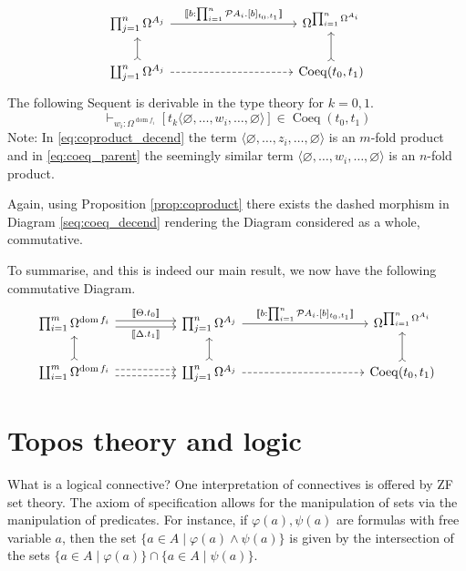 \documentclass{tac}
\newcommand{\call}[1]{\mathcal{#1}}
\begin{document}
	\begin{equation}\label{eq:coeq_parent}
		\begin{tikzcd}[column sep = huge]
			\prod_{j = 1}^n\Omega^{A_j} \arrow[rr,"{\llbracket b:\prod_{i = 1}^n \call{P}A_i. [b]_{t_0,t_1} \rrbracket}"] && \Omega^{\prod_{i = 1}^n \Omega^{A_i}}\\
			\coprod_{j = 1}^n \Omega^{A_j}\arrow[u,rightarrowtail]\arrow[rr,dashed] && \operatorname{Coeq}(t_0,t_1)\arrow[u,rightarrowtail]
		\end{tikzcd}
	\end{equation}
	The following Sequent is derivable in the type theory for $k=0,1$.
	\begin{equation}\label{seq:coeq_decend}
		\vdash_{w_i:\Omega^{\operatorname{dom}f_i}}[t_k\langle \varnothing, \hdots, w_i, \hdots, \varnothing \rangle] \in \operatorname{Coeq}(t_0,t_1)
	\end{equation}
	Note: In \eqref{eq:coproduct_decend} the term $\langle \varnothing, \hdots, z_i, \hdots, \varnothing \rangle$ is an $m$-fold product and in \eqref{eq:coeq_parent} the seemingly similar term $\langle \varnothing, \hdots, w_i, \hdots, \varnothing \rangle$ is an $n$-fold product.
	
	Again, using Proposition \ref{prop:coproduct} there exists the dashed morphism in Diagram \eqref{seq:coeq_decend} rendering the Diagram considered as a whole, commutative.
	
	To summarise, and this is indeed our main result, we now have the following commutative Diagram.
	\begin{equation}\label{eq:colimit_complete}
		\begin{tikzcd}[column sep = huge]
			\prod_{i = 1}^m \Omega^{\operatorname{dom}f_i}\arrow[r,shift left, "{\llbracket\Theta.  t_0 \rrbracket}"]\arrow[r,swap,shift right,"{\llbracket \Delta. t_1\rrbracket}"] & \prod_{j = 1}^n\Omega^{A_j} \arrow[rr,"{\llbracket b:\prod_{i = 1}^n \call{P}A_i. [b]_{t_0,t_1} \rrbracket}"] & & \Omega^{\prod_{i = 1}^n \Omega^{A_i}}\\
			\coprod_{i = 1}^m \Omega^{\operatorname{dom}f_i}\arrow[u,rightarrowtail]\arrow[r,shift left, dashed]\arrow[r,dashed, shift right] & \coprod_{j = 1}^n \Omega^{A_j}\arrow[u,rightarrowtail]\arrow[rr,dashed] & & \operatorname{Coeq}(t_0,t_1)\arrow[u,rightarrowtail]
		\end{tikzcd}
	\end{equation}


	\appendix
	\section{Topos theory and logic}\label{sec:topos_struc}
	What is a logical connective? One interpretation of connectives is offered by ZF set theory. The axiom of specification allows for the manipulation of sets via the manipulation of predicates. For instance, if $\varphi(a),\psi(a)$ are formulas with free variable $a$, then the set $\lbrace a\in A \mid \varphi(a) \wedge \psi(a)\rbrace$ is given by the intersection of the sets $\lbrace a \in A \mid \varphi(a)\rbrace \cap \lbrace a \in A \mid \psi(a)\rbrace$.
	
\end{document}
